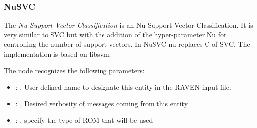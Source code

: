 \subsubsection{NuSVC}
  The  \textit{Nu-Support Vector Classification} is an Nu-Support Vector
  Classification.                             It is very similar to SVC but with the addition of the
  hyper-parameter Nu for controlling the                             number of support vectors. In
  NuSVC nu replaces C of SVC.                             The implementation is based on libsvm.

  The  node recognizes the following parameters:
    \begin{itemize}
      \item {}: , 
        User-defined name to designate this entity in the RAVEN input file.
      \item {}: , 
        Desired verbosity of messages coming from this entity
      \item {}: , 
        specify the type of ROM that will be used
  \end{itemize}

